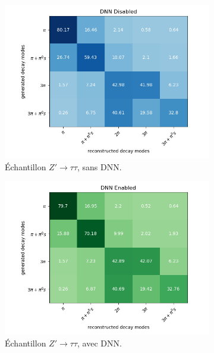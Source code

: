 \begin{figure}[!ht]
  \begin{subfigure}{0.5\linewidth}
    \centering
    \includegraphics[width=1\linewidth]{Chapitre4/Images/DMmatrices/Matrix_DNNDisabled_ZpTT.png} 
    \caption{Échantillon $Z'\rightarrow\tau\tau$, sans DNN.}
    \vspace{0.5ex}
  \end{subfigure}
  \begin{subfigure}{0.5\linewidth}
    \centering
    \includegraphics[width=1\linewidth]{Chapitre4/Images/DMmatrices/Matrix_DNNEnabled_ZpTT.png} 
    \caption{Échantillon $Z'\rightarrow\tau\tau$, avec DNN.}
    \vspace{0.5ex}
  \end{subfigure} 
  \begin{subfigure}{0.5\linewidth}

\end{subfigure}
\end{figure}
